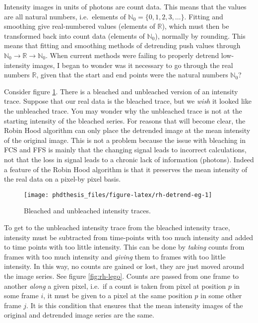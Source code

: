 \documentclass[12pt,]{book}
\theoremstyle{definition}
\theoremstyle{definition}
\theoremstyle{definition}
\theoremstyle{remark}
\begin{document}
Intensity images in units of photons are count data. This means that the
values are all natural numbers, i.e.~elements of
\(\mathbb{N}_0=\{0, 1, 2, 3, \ldots\}\). Fitting and smoothing give
real-numbered values (elements of \(\mathbb{R}\)), which must then be
transformed back into count data (elements of \(\mathbb{N}_0\)),
normally by rounding. This means that fitting and smoothing methods of
detrending push values through
\(\mathbb{N}_0 \rightarrow \mathbb{R} \rightarrow \mathbb{N}_0\). When
current methods were failing to properly detrend low-intensity images, I
began to wonder was it necessary to go through the real numbers
\(\mathbb{R}\), given that the start and end points were the natural
numbers \(\mathbb{N}_0\)?

Consider figure \ref{fig:rh-detrend-eg}. There is a bleached and
unbleached version of an intensity trace. Suppose that our real data is
the bleached trace, but we \emph{wish} it looked like the unbleached
trace. You may wonder why the unbleached trace is not at the starting
intensity of the bleached series. For reasons that will become clear,
the Robin Hood algorithm can only place the detrended image at the mean
intensity of the original image. This is not a problem because the issue
with bleaching in FCS and FFS is mainly that the changing signal leads
to incorrect calculations, not that the loss in signal leads to a
chronic lack of information (photons). Indeed a feature of the Robin
Hood algorithm is that it preserves the mean intensity of the real data
on a pixel-by pixel basis.



\begin{figure}

\texttt{[image: phdthesis\_files/figure-latex/rh-detrend-eg-1]} \hfill{}

\caption{Bleached and unbleached intensity traces.}\label{fig:rh-detrend-eg}
\end{figure}

To get to the unbleached intensity trace from the bleached intensity
trace, intensity must be subtracted from time-points with too much
intensity and added to time points with too little intensity. This can
be done by \emph{taking} counts from frames with too much intensity and
\emph{giving} them to frames with too little intensity. In this way, no
counts are gained or lost, they are just moved around the image series.
See figure \ref{fig:rh-lego}. Counts are passed from one frame to
another \emph{along} a given pixel, i.e.~if a count is taken from pixel
at position \(p\) in some frame \(i\), it must be given to a pixel at
the same position \(p\) in some other frame \(j\). It is this condition
that ensures that the mean intensity images of the original and
detrended image series are the same.
\end{document}
